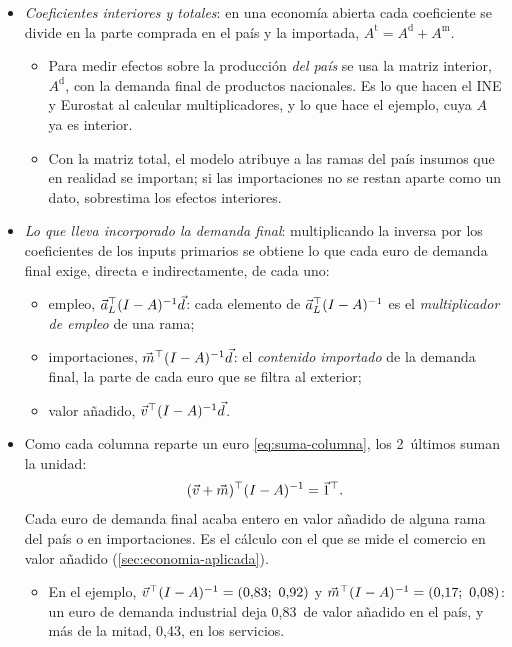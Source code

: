 \documentclass[11pt]{article}
\begin{document}
\begin{itemize}
\item \emph{Coeficientes interiores y totales}: en una economía abierta cada coeficiente se divide en la parte comprada en el país y la importada, $A^{\mathrm t}=A^{\mathrm d}+A^{\mathrm m}$.
  \begin{itemize}
  \item Para medir efectos sobre la producción \emph{del país} se usa la matriz interior, $A^{\mathrm d}$, con la demanda final de productos nacionales. Es lo que hacen el INE y Eurostat al calcular multiplicadores, y lo que hace el ejemplo, cuya $A$ ya es interior.
  \item Con la matriz total, el modelo atribuye a las ramas del país insumos que en realidad se importan; si las importaciones no se restan aparte como un dato, sobrestima los efectos interiores.
  \end{itemize}
\item \emph{Lo que lleva incorporado la demanda final}: multiplicando la inversa por los coeficientes de los inputs primarios se obtiene lo que cada euro de demanda final exige, directa e indirectamente, de cada uno:
  \begin{itemize}
  \item empleo, $\vec{a}_L^{\top}(I-A)^{-1}\vec{d}$: cada elemento de $\vec{a}_L^{\top}(I-A)^{-1}$ es el \emph{multiplicador de empleo} de una rama;
  \item importaciones, $\vec{m}^{\top}(I-A)^{-1}\vec{d}$: el \emph{contenido importado} de la demanda final, la parte de cada euro que se filtra al exterior;
  \item valor añadido, $\vec{v}^{\top}(I-A)^{-1}\vec{d}$.
  \end{itemize}
\item Como cada columna reparte un euro \eqref{eq:suma-columna}, los 2~últimos suman la unidad:
\begin{equation}\label{eq:contenido}
(\vec{v}+\vec{m})^{\top}(I-A)^{-1}=\vec{1}^{\top}.
\end{equation}
  Cada euro de demanda final acaba entero en valor añadido de alguna rama del país o en importaciones. Es el cálculo con el que se mide el comercio en valor añadido (\ref{sec:economia-aplicada}).
  \begin{itemize}
  \item En el ejemplo, $\vec{v}^{\top}(I-A)^{-1}=(0{,}83;\ 0{,}92)$ y $\vect{m}^{\top}(I-A)^{-1}=(0{,}17;\ 0{,}08)$: un euro de demanda industrial deja 0,83~de valor añadido en el país, y más de la mitad, 0,43, en los servicios.

\end{itemize}
\end{itemize}
\end{document}
